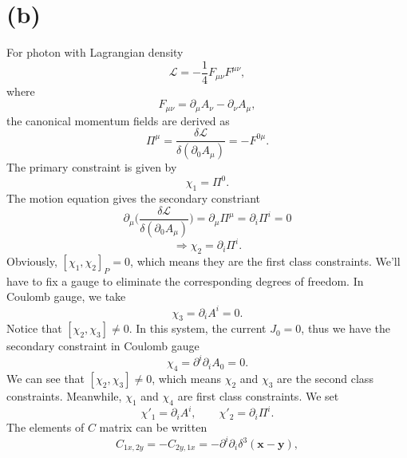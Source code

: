 \documentclass[12pt]{article}
\begin{document}
\section*{(b)}

For photon with Lagrangian density
\begin{equation}
    \mathcal{L}=-\frac{1}{4}F_{\mu\nu}F^{\mu\nu},
\end{equation}
where
\begin{equation}
    F_{\mu \nu}=\partial_{\mu} A_{\nu}-\partial_{\nu} A_{\mu},
\end{equation}
the canonical momentum fields are derived as 
\begin{equation}
    \Pi^\mu=\frac{\delta\mathcal{L}}{\delta(\partial_0A_\mu)}=-F^{0\mu}.
\end{equation}
The primary constraint is given by
\begin{equation}
    \chi_1=\Pi^0.
\end{equation}
The motion equation gives the secondary constriant 
\begin{equation}
    \partial_\mu\bigg(\frac{\delta\mathcal{L}}{\delta(\partial_0A_\mu)}\bigg)=
    \partial_\mu\Pi^\mu=\partial_i\Pi^i=0
\end{equation}
\begin{equation}
    \Rightarrow \chi_2=\partial_i\Pi^i.
\end{equation}
Obviously, $[\chi_1,\chi_2]_P=0$, which means they are the first class constraints. 
We'll have to fix a gauge to eliminate the corresponding degrees of freedom. In 
Coulomb gauge, we take
\begin{equation}
    \chi_3=\partial_iA^i=0.
\end{equation}
Notice that $[\chi_2,\chi_3]\neq0$. In this system, the current $J_0=0$, thus we 
have the secondary constraint in Coulomb gauge 
\begin{equation}
    \chi_4=\partial^i\partial_iA_0=0.
\end{equation}
We can see that $[\chi_2,\chi_3]\neq0$, which means $\chi_2$ and $\chi_3$ are 
the second class constraints. Meanwhile, $\chi_1$ and $\chi_4$ are first class 
constraints. We set
\begin{equation}
    \chi'_1=\partial_iA^i,\qquad\chi'_2=\partial_i\Pi^i.
\end{equation}
The elements of $C$ matrix can be written
\begin{equation}
    C_{1x,2y}=-C_{2y,1x}=-\partial^i\partial_i\delta^{3}(\mathbf{x}-\mathbf{y}),
\end{equation}
\end{document}
